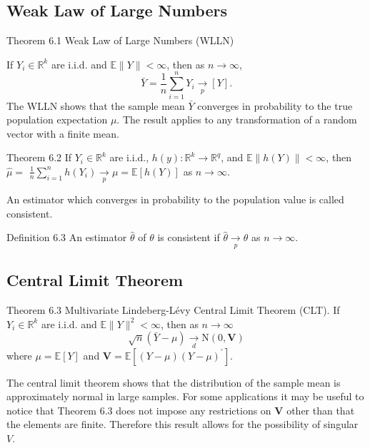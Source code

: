 \documentclass[10pt]{article}
\begin{document}
\subsection{Weak Law of Large Numbers}
Theorem 6.1 Weak Law of Large Numbers (WLLN)

If $Y_{i} \in \mathbb{R}^{k}$ are i.i.d. and $\mathbb{E}\|Y\|<\infty$, then as $n \rightarrow \infty$,
$$
\bar{Y}=\frac{1}{n} \sum_{i=1}^{n} Y_{i} \underset{p}{\longrightarrow}[Y] .
$$
The WLLN shows that the sample mean $\bar{Y}$ converges in probability to the true population expectation $\mu$. The result applies to any transformation of a random vector with a finite mean.

Theorem 6.2 If $Y_{i} \in \mathbb{R}^{k}$ are i.i.d., $h(y): \mathbb{R}^{k} \rightarrow \mathbb{R}^{q}$, and $\mathbb{E}\|h(Y)\|<\infty$, then $\widehat{\mu}=$ $\frac{1}{n} \sum_{i=1}^{n} h\left(Y_{i}\right) \underset{p}{\rightarrow} \mu=\mathbb{E}[h(Y)]$ as $n \rightarrow \infty$.

An estimator which converges in probability to the population value is called consistent.

Definition 6.3 An estimator $\widehat{\theta}$ of $\theta$ is consistent if $\widehat{\theta} \underset{p}{\longrightarrow} \theta$ as $n \rightarrow \infty$.

\subsection{Central Limit Theorem}
Theorem 6.3 Multivariate Lindeberg-Lévy Central Limit Theorem (CLT). If $Y_{i} \in \mathbb{R}^{k}$ are i.i.d. and $\mathbb{E}\|Y\|^{2}<\infty$, then as $n \rightarrow \infty$
$$
\sqrt{n}(\bar{Y}-\mu) \underset{d}{\longrightarrow} \mathrm{N}(0, \boldsymbol{V})
$$
where $\mu=\mathbb{E}[Y]$ and $\boldsymbol{V}=\mathbb{E}\left[(Y-\mu)(Y-\mu)^{\prime}\right]$.

The central limit theorem shows that the distribution of the sample mean is approximately normal in large samples. For some applications it may be useful to notice that Theorem $6.3$ does not impose any restrictions on $\boldsymbol{V}$ other than that the elements are finite. Therefore this result allows for the possibility of singular $V$.
\end{document}
